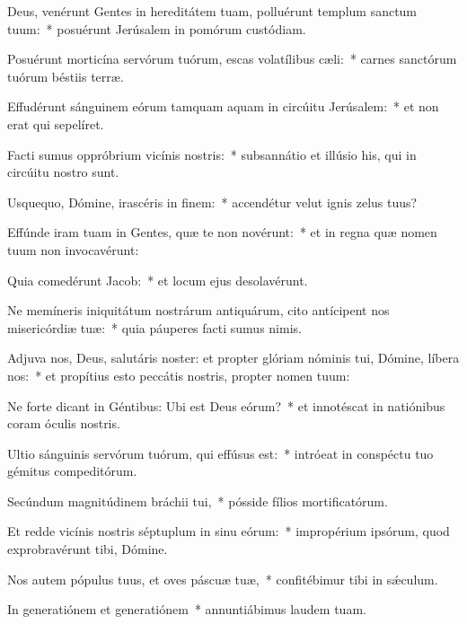 \item Deus, venérunt Gentes in hereditátem tuam, polluérunt templum sanctum tuum:~* posuérunt Jerúsalem in pomórum custódiam.

\item Posuérunt morticína servórum tuórum, escas volatílibus cæli:~* carnes sanctórum tuórum béstiis terræ.

\item Effudérunt sánguinem eórum tamquam aquam in circúitu Jerúsalem:~* et non erat qui sepelíret.

\item Facti sumus oppróbrium vicínis nostris:~* subsannátio et illúsio his, qui in circúitu nostro sunt.

\item Usquequo, Dómine, irascéris in finem:~* accendétur velut ignis zelus tuus?

\item Effúnde iram tuam in Gentes, quæ te non novérunt:~* et in regna quæ nomen tuum non invocavérunt:

\item Quia comedérunt Jacob:~* et locum ejus desolavérunt.

\item Ne memíneris iniquitátum nostrárum antiquárum, cito antícipent nos misericórdiæ tuæ:~* quia páuperes facti sumus nimis.

\item Adjuva nos, Deus, salutáris noster: et propter glóriam nóminis tui, Dómine, líbera nos:~* et propítius esto peccátis nostris, propter nomen tuum:

\item Ne forte dicant in Géntibus: Ubi est Deus eórum?~* et innotéscat in natiónibus coram óculis nostris.

\item Ultio sánguinis servórum tuórum, qui effúsus est:~* intróeat in conspéctu tuo gémitus compeditórum.

\item Secúndum magnitúdinem bráchii tui,~* pósside fílios mortificatórum.

\item Et redde vicínis nostris séptuplum in sinu eórum:~* impropérium ipsórum, quod exprobravérunt tibi, Dómine.

\item Nos autem pópulus tuus, et oves páscuæ tuæ,~* confitébimur tibi in sǽculum.

\item In generatiónem et generatiónem~* annuntiábimus laudem tuam.